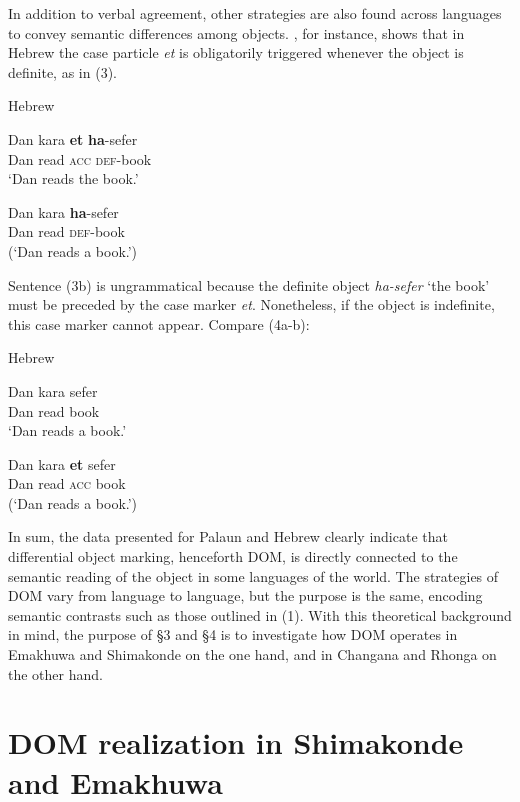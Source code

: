 \documentclass[output=paper]{langsci/langscibook}
\begin{document}
In addition to verbal agreement, other strategies are also found across languages to convey semantic differences among objects. \citet{Danon2002}, for instance, shows that in Hebrew the case particle {\textit{et}} is obligatorily triggered whenever the object is definite, as in (3).

{Hebrew \citep[1]{Danon2002}}

\ea
\gll Dan       kara       \textbf{et}       \textbf{ha}{}-sefer\\
     Dan       read       {\textsc{acc     def}}{}-book\\
\glt ‘Dan reads the book.’
\z

\ea
\gll *Dan       kara              \textbf{ha}{}-sefer\\
     Dan         read              \textsc{def}{}-book\\
\glt (‘Dan reads a book.’)
\z



Sentence (3b) is ungrammatical because the definite object {\textit{ha-sefer}} ‘the book’ must be preceded by the case marker {\textit{et}}. Nonetheless, if the object is indefinite, this case marker cannot appear. Compare (4a-b):

{Hebrew \citep[1]{Danon2002}}

\ea
\gll Dan         kara                 sefer\\
     Dan         read                  book\\
\glt ‘Dan reads a book.’
\z

\ea
\gll *Dan        kara        \textbf{et}      sefer\\
     Dan          read        {\textsc{acc}}   {}book\\
\glt (‘Dan reads a book.’)
\z

In sum, the data presented for Palaun and Hebrew clearly indicate that differential object marking, henceforth DOM, is directly connected to the semantic reading of the object in some languages of the world. The strategies of DOM vary from language to language, but the purpose is the same, encoding semantic contrasts such as those outlined in (1). With this theoretical background in mind, the purpose of §3 and §4 is to investigate how DOM operates in Emakhuwa and Shimakonde on the one hand, and in Changana and Rhonga on the other hand.

\section{DOM realization in Shimakonde and Emakhuwa}
\end{document}
